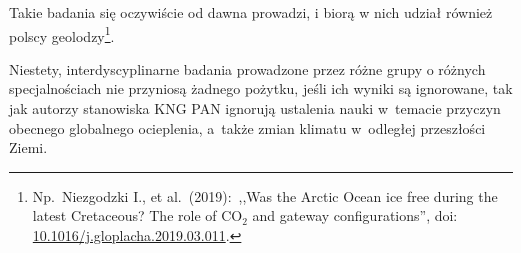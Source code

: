 \documentclass[12pt]{article}
\newcommand{\doi}[1]{doi: \href{htts://doi.org/#1}{#1}}
\begin{document}
Takie badania się oczywiście od dawna prowadzi, i biorą w nich udział również polscy geolodzy\footnote{Np.~Niezgodzki I., et al.~(2019):~,,Was the Arctic Ocean ice free during the latest Cretaceous? The role of CO$_2$ and gateway configurations'', \doi{10.1016/j.gloplacha.2019.03.011}.}.
			
Niestety, interdyscyplinarne badania prowadzone przez różne grupy o różnych specjalnościach nie przyniosą żadnego pożytku, jeśli ich wyniki są ignorowane, tak jak autorzy stanowiska KNG PAN ignorują ustalenia nauki w~temacie przyczyn obecnego globalnego ocieplenia, a~także zmian klimatu w~odległej przeszłości Ziemi.
\end{document}
